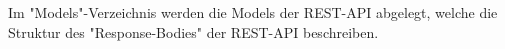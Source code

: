 
Im "Models"-Verzeichnis werden die Models der REST-API abgelegt, welche die Struktur des "Response-Bodies" der REST-API beschreiben.
